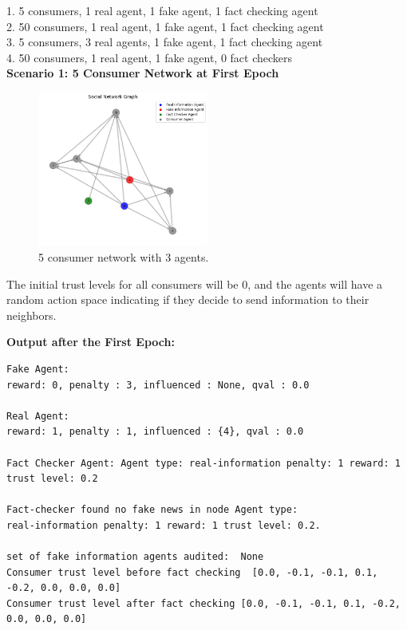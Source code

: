 \documentclass[twoside]{article}
\begin{document}
1. 5 consumers, 1 real agent, 1 fake agent, 1 fact checking agent\\
2. 50 consumers, 1 real agent, 1 fake agent, 1 fact checking agent\\
3. 5 consumers, 3 real agents, 1 fake agent, 1 fact checking agent\\
4. 50 consumers, 1 real agent, 1 fake agent, 0 fact checkers\\

\textbf{Scenario 1: 5 Consumer Network at First Epoch}

\begin{figure}[htbp]
     \centering
     \includegraphics[width=0.5\textwidth]{../results/images/Initial_network.png}
     \caption{5 consumer network with 3 agents.}
     \label{fig: 5 consumer network, 3 agents}
 \end{figure}
 

The initial trust levels for all consumers will be 0, and the agents will have a random action space indicating if they decide to send information to their neighbors.

\pagebreak
\textbf{Output after the First Epoch:}

\begin{verbatim}
Fake Agent: 
reward: 0, penalty : 3, influenced : None, qval : 0.0

Real Agent: 
reward: 1, penalty : 1, influenced : {4}, qval : 0.0

Fact Checker Agent: Agent type: real-information penalty: 1 reward: 1 trust level: 0.2

Fact-checker found no fake news in node Agent type: 
real-information penalty: 1 reward: 1 trust level: 0.2.

set of fake information agents audited:  None
Consumer trust level before fact checking  [0.0, -0.1, -0.1, 0.1, -0.2, 0.0, 0.0, 0.0]
Consumer trust level after fact checking [0.0, -0.1, -0.1, 0.1, -0.2, 0.0, 0.0, 0.0]

\end{verbatim}
\end{document}
